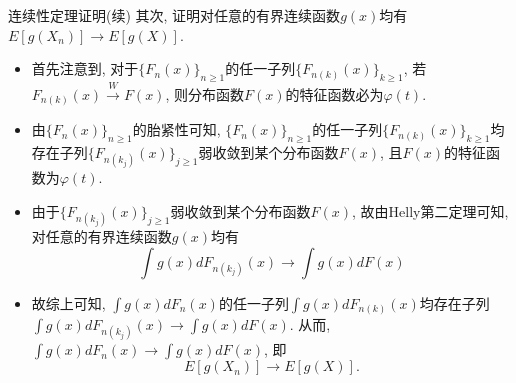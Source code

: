 \begin{frame}{连续性定理证明(续)}
其次, 证明对任意的有界连续函数$g(x)$均有 $E[g(X_n)]\rightarrow E[g(X)]$. \pause
\begin{itemize}[<+-|alert@+>]
\item 首先注意到, 对于$\{F_n(x)\}_{n\geq 1}$的任一子列$\{F_{n(k)}(x)\}_{k\geq 1}$, 若$F_{n(k)} (x)\stackrel{W}{\rightarrow} F (x)$, 则分布函数$F(x)$的特征函数必为$\varphi(t)$.
\item 由$\{F_n(x)\}_{n\geq 1}$的胎紧性可知, $\{F_n(x)\}_{n\geq 1}$的任一子列$\{F_{n(k)}(x)\}_{k\geq 1}$均存在子列$\{F_{n(k_j)}(x)\}_{j\geq 1}$弱收敛到某个分布函数$F(x)$, 且$F(x)$的特征函数为$\varphi(t)$.

\item 由于$\{F_{n(k_j)}(x)\}_{j\geq 1}$弱收敛到某个分布函数$F(x)$, 故由Helly第二定理可知, 对任意的有界连续函数$g(x)$均有
\[\int g(x)dF_{n(k_j)}(x)\rightarrow \int g(x)dF(x)\]

\item 故综上可知, $\int g(x)dF_{n}(x)$的任一子列$\int g(x)dF_{n(k)}(x)$均存在子列$\int g(x)dF_{n(k_j)}(x)\rightarrow \int g(x)dF(x)$. 从而, $\int g(x)dF_{n}(x)\rightarrow \int g(x)dF(x)$, 即 $$E[g(X_n)]\rightarrow E[g(X)].$$
\end{itemize}

\end{frame}





